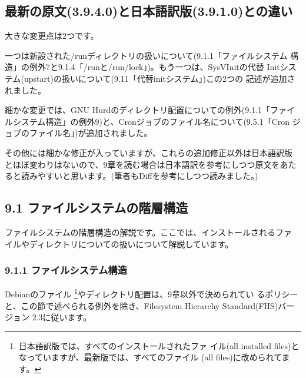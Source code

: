 \documentclass[mingoth,a4paper]{jsarticle}
\begin{document}
\subsection{最新の原文(3.9.4.0)と日本語訳版(3.9.1.0)との違い}

大きな変更点は2つです。

一つは新設された/runディレクトリの扱いについて(9.1.1「ファイルシステム
構造」の例外7と9.1.4「/runと/run/lock」)。もう一つは、SysVInitの代替
Initシステム(upstart)の扱いについて(9.11「代替initシステム」)この2つの
記述が追加されました。

細かな変更では、GNU Hurdのディレクトリ配置についての例外(9.1.1「ファイ
ルシステム構造」の例外9)と、Cronジョブのファイル名について(9.5.1「Cron
ジョブのファイル名」)が追加されました。

その他には細かな修正が入っていますが、これらの追加修正以外は日本語訳版
とほぼ変わりはないので、9章を読む場合は日本語訳を参考にしつつ原文をあた
ると読みやすいと思います。(筆者もDiffを参考にしつつ読みました。)

\subsection{9.1 ファイルシステムの階層構造}

ファイルシステムの階層構造の解説です。ここでは、インストールされるファ
イルやディレクトリについての扱いについて解説しています。

\subsubsection{9.1.1 ファイルシステム構造}

Debianのファイル \footnote{日本語訳版では、すべてのインストールされたファ
イル(all installed files)となっていますが、最新版では、すべてのファイル
(all files)に改められてます。}やディレクトリ配置は、9章以外で決められてい
るポリシーと、この節で述べられる例外を除き、Filesystem Hierarchy
Standard(FHS)バージョン 2.3に従います。
\end{document}
